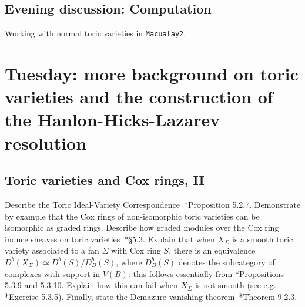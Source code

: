 \documentclass[11pt]{amsart}
\numberwithin{equation}{section}
\theoremstyle{definition}
\theoremstyle{remark}
\newcommand{\PP}{\mathbb P}
\newcommand{\Spec}{\operatorname{Spec}}
\begin{document}











\subsection*{Evening discussion: Computation}  Working with normal toric varieties in {\tt Macualay2}.


\section{Tuesday: more background on toric varieties and the construction of the Hanlon-Hicks-Lazarev resolution}

\subsection{Toric varieties and Cox rings, II}
Describe the Toric Ideal-Variety Correspondence~\cite{CLS2011}*{Proposition 5.2.7}. Demonstrate by example that the Cox rings of non-isomorphic toric varieties can be isomorphic as graded rings. Describe how graded modules over the Cox ring induce sheaves on toric varieties~\cite{CLS2011}*{\S 5.3}. Explain that when $X_\Sigma$ is a smooth toric variety associated to a fan $\Sigma$ with Cox ring $S$, there is an equivalence $D^b(X_\Sigma) \simeq D^b(S) / D^b_B(S)$, where $D^b_B(S)$ denotes the subcategory of complexes with support in $V(B)$: this follows essentially from \cite{CLS2011}*{Propositions 5.3.9 and 5.3.10}. Explain how this can fail when $X_\Sigma$ is not smooth (see e.g. \cite{CLS2011}*{Exercise 5.3.5}).  %
Finally, state the Demazure vanishing theorem~\cite{CLS2011}*{Theorem 9.2.3}. 
\end{document}
